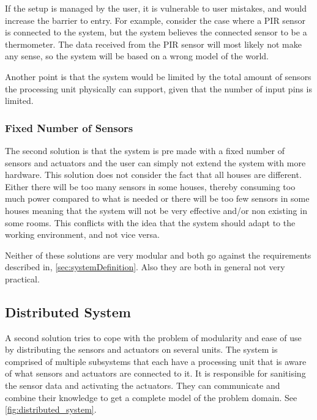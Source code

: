 If the setup is managed by the user, it is vulnerable to user mistakes, and would increase the barrier to entry. For example, consider the case where a PIR sensor is connected to the system, but the system believes the connected sensor to be a thermometer. The data received from the PIR sensor will most likely not make any sense, so the system will be based on a wrong model of the world.

Another point is that the system would be limited by the total amount of sensors the processing unit physically can support, given that the number of input pins is limited.

\subsubsection{Fixed Number of Sensors}
The second solution is that the system is pre made with a fixed number of sensors and actuators and the user can simply not extend the system with more hardware. This solution does not consider the fact that all houses are different. Either there will be too many sensors in some houses, thereby consuming too much power compared to what is needed or there will be too few sensors in some houses meaning that the system will not be very effective and/or non existing in some rooms. This conflicts with the idea that the system should adapt to the working environment, and not vice versa.

Neither of these solutions are very modular and both go against the requirements described in, \cref{sec:systemDefinition}. Also they are both in general not very practical.

\subsection{Distributed System}
A second solution tries to cope with the problem of modularity and ease of use by distributing the sensors and actuators on several units. The system is comprised of multiple subsystems that each have a processing unit that is aware of what sensors and actuators are connected to it. It is responsible for sanitising the sensor data and activating the actuators. They can communicate and combine their knowledge to get a complete model of the problem domain. See \cref{fig:distributed_system}.

